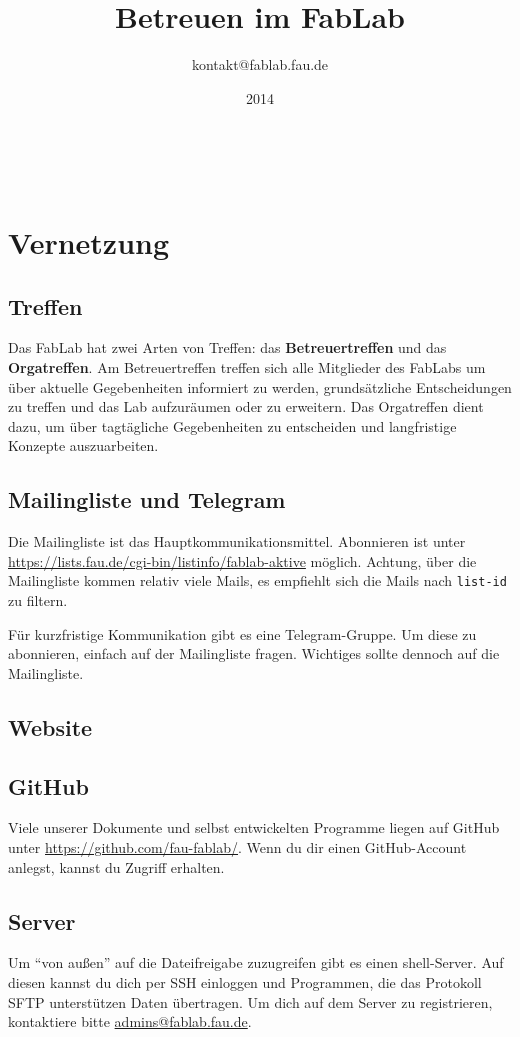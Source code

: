 \documentclass{\basedir/fablab-document}
\date{2014}
\author{kontakt@fablab.fau.de}
\title{Betreuen im FabLab}
\let\todox\todo
\renewcommand\todo[1]{\todox[inline]{#1}}
\begin{document}
~
\section{Vernetzung}
\subsection{Treffen}
Das FabLab hat zwei Arten von Treffen: das \textbf{Betreuertreffen} und das \textbf{Orgatreffen}.
Am Betreuertreffen treffen sich alle Mitglieder des FabLabs um über aktuelle Gegebenheiten informiert zu werden,
grundsätzliche Entscheidungen zu treffen und das Lab aufzuräumen oder zu erweitern.
Das Orgatreffen dient dazu, um über tagtägliche Gegebenheiten zu entscheiden und langfristige Konzepte auszuarbeiten.

\subsection{Mailingliste und Telegram}
Die Mailingliste ist das Hauptkommunikationsmittel.
Abonnieren ist unter \url{https://lists.fau.de/cgi-bin/listinfo/fablab-aktive} möglich.
Achtung, über die Mailingliste kommen relativ viele Mails, es empfiehlt sich die Mails nach \texttt{list-id} zu filtern.

Für kurzfristige Kommunikation gibt es eine Telegram-Gruppe.
Um diese zu abonnieren, einfach auf der Mailingliste fragen.
Wichtiges sollte dennoch auf die Mailingliste.
\subsection{Website}
\todo{Website}
\subsection{GitHub}
Viele unserer Dokumente und selbst entwickelten Programme liegen auf GitHub unter \url{https://github.com/fau-fablab/}.
Wenn du dir einen GitHub-Account anlegst, kannst du Zugriff erhalten.

\subsection{Server}
Um \enquote{von außen} auf die Dateifreigabe zuzugreifen gibt es einen shell-Server.
Auf diesen kannst du dich per SSH einloggen und Programmen, die das Protokoll SFTP unterstützen Daten übertragen.
Um dich auf dem Server zu registrieren, kontaktiere bitte \url{admins@fablab.fau.de}.
\end{document}
